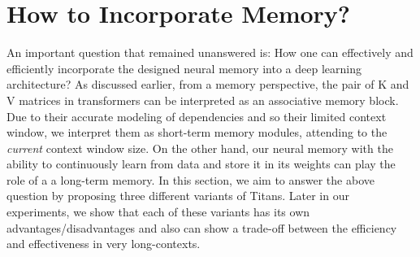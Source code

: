 \documentclass{article}
\begin{document}
\section{How to Incorporate Memory?}\label{sec:arch}
\lettrine[lines=3]{A}{}n important question that remained unanswered is: How one can effectively and efficiently incorporate the designed neural memory into a deep learning architecture? As discussed earlier, from a memory perspective, the pair of K and V matrices in transformers can be interpreted as an associative memory block. Due to their accurate modeling of dependencies and so their limited context window, we interpret them as short-term memory modules, attending to the \emph{current} context window size. On the other hand, our neural memory with the ability to continuously learn from data and store it in its weights can play the role of a a long-term memory. In this section, we aim to answer the above question by proposing three different variants of Titans. Later in our experiments, we show that each of these variants has its own advantages/disadvantages and also can show a trade-off between the efficiency and effectiveness in very long-contexts. 
\end{document}
